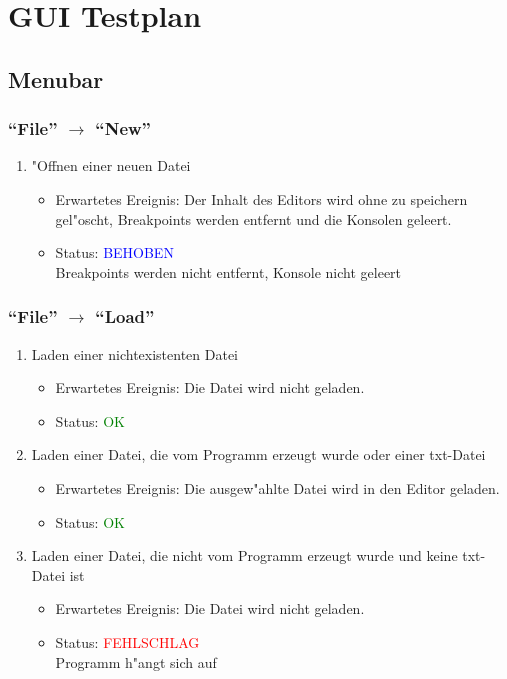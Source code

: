 \section{GUI Testplan}
\subsection{Menubar}
\subsubsection{"`File"' $\rightarrow$ "`New"'}
\begin{enumerate}
\item "Offnen einer neuen Datei
\begin{itemize}
\item Erwartetes Ereignis: Der Inhalt des Editors wird ohne zu speichern gel"oscht, Breakpoints werden entfernt und die Konsolen geleert. 
\item Status: \textcolor{blue}{BEHOBEN} \\
Breakpoints werden nicht entfernt, Konsole nicht geleert
\end{itemize}
\end{enumerate}
\subsubsection{"`File"' $\rightarrow$ "`Load"'}
\begin{enumerate}
\item Laden einer nichtexistenten Datei
\begin{itemize}
\item Erwartetes Ereignis: Die Datei wird nicht geladen. 
\item Status: \textcolor{green}{OK} 
\end{itemize}
\item Laden einer Datei, die vom Programm erzeugt wurde oder einer txt-Datei
\begin{itemize}
\item Erwartetes Ereignis: Die ausgew"ahlte Datei wird in den Editor geladen. 
\item Status: \textcolor{green}{OK}
\end{itemize}
\item Laden einer Datei, die nicht vom Programm erzeugt wurde und keine txt-Datei ist
\begin{itemize}
\item Erwartetes Ereignis: Die Datei wird nicht geladen. 
\item Status: \textcolor{red}{FEHLSCHLAG} \\
Programm h"angt sich auf
\end{itemize}
\end{enumerate}
